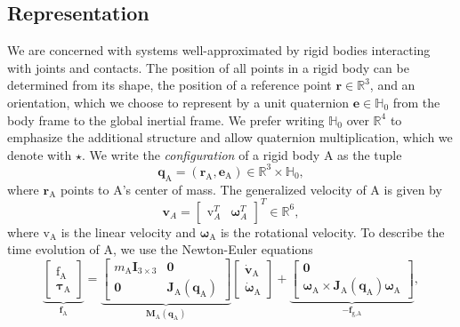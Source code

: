 \documentclass[preprint,12pt]{elsarticle}
\let\vec\bm
\let\mat\mathbf
\numberwithin{equation}{section}
\def\linvel{\mathrm{v}}
\def\linacc{\dot{\vec{v}}}
\def\angvel{\vec{\omega}}
\def\angacc{\dot{\vec{\omega}}}
\def\quat{e}
\def\conf{q}
\def\tA{\text{A}}
\def\tg{\text{g}}
\begin{document}
\subsection{Representation}
We are concerned with systems well-approximated by rigid bodies interacting with joints and contacts.
The position of all points in a rigid body can be determined from its shape, the position of a reference point $\vec{r} \in \mathbb{R}^3$, and an orientation, which we choose to represent by a unit quaternion $\vec{\quat} \in \mathbb{H}_0$ from the body frame to the global inertial frame.
We prefer writing $\mathbb{H}_0$ over $\mathbb{R}^4$ to emphasize the additional structure and allow quaternion multiplication, which we denote with $\star$.
We write the \emph{configuration} of a rigid body $\tA$ as the tuple
\begin{equation}
    \label{eq:configuration}
    \vec{\conf}_\tA= (\vec{r}_\tA, \vec{\quat}_\tA) \in \mathbb{R}^{3} \times \mathbb{H}_0,
\end{equation}
where $\vec{r}_\tA$ points to $\tA$'s center of mass.
The generalized velocity of $\tA$ is given by
\begin{equation}
    \label{eq:generalized_velocity}
    \vec{v}_A= \begin{bmatrix}
        \vec{\linvel}_A^T & \angvel_A^T
    \end{bmatrix}^T\in \mathbb{R}^{6},
\end{equation}
where $\vec{\linvel}_\tA$ is the linear velocity and  $\angvel_\tA$ is the rotational velocity.
To describe the time evolution of $\tA$, we use the Newton-Euler equations
\begin{equation}
    \underbrace{
        \begin{bmatrix}
            \vec{\mathrm{f}}_\tA \\ \vec{\tau}_\tA
        \end{bmatrix}
    }_{\vec{f}_\tA} =
    \underbrace{
        \begin{bmatrix}
            m_\tA \mat{I}_{3\times3} & \vec{0}   \\
            \vec{0}     & \mat{J}_\tA(\vec{\conf}_\tA)
        \end{bmatrix}
    }_{\mat{M}_\tA(\vec{\conf}_\tA)}
    \begin{bmatrix}
        \linacc_\tA \\ \angacc_\tA
    \end{bmatrix}
    +
    \underbrace{
        \begin{bmatrix}
            \vec{0} \\
            \angvel_\tA \times \mat{J}_\tA(\vec{\conf}_\tA) \angvel_\tA
        \end{bmatrix}
    }_{-\vec{f}_{\tg,\tA}},
\end{equation}
\end{document}
